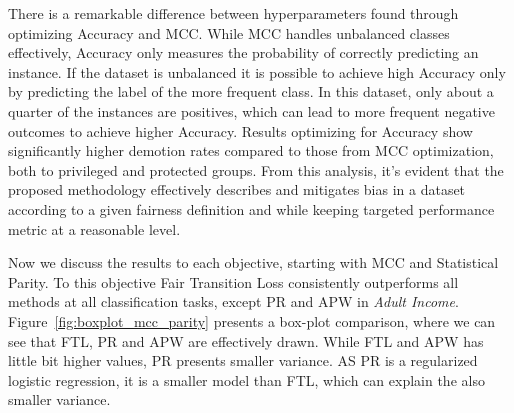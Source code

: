There is a remarkable difference between hyperparameters found through optimizing Accuracy and MCC. While MCC handles unbalanced classes effectively, Accuracy only measures the probability of correctly predicting an instance. If the dataset is unbalanced it is possible to achieve high Accuracy only by predicting the label of the more frequent class. In this dataset, only about a quarter of the instances are positives, which can lead to more frequent negative outcomes to achieve higher Accuracy. Results optimizing for Accuracy show significantly higher demotion rates compared to those from MCC optimization, both to privileged and protected groups. From this analysis, it's evident that the proposed methodology effectively describes and mitigates bias in a dataset according to a given fairness definition and while keeping targeted performance metric at a reasonable level.

Now we discuss the results to each objective, starting with MCC and Statistical Parity. To this objective Fair Transition Loss consistently outperforms all methods at all classification tasks, except PR and APW in \textit{Adult Income}. Figure~\ref{fig:boxplot_mcc_parity} presents a box-plot comparison, where we can see that FTL, PR and APW are effectively drawn. While FTL and APW has little bit higher values, PR presents smaller variance. AS PR is a regularized logistic regression, it is a smaller model than FTL, which can explain the also smaller variance.

